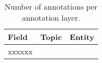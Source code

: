 \documentclass[preview=true]{standalone}
\begin{document}
\begin{table}[ht]
	\footnotesize
	\begin{tabularx}{\linewidth}{XXl}%
		\toprule
		\textbf{Field} &\textbf{Topic}&\textbf{Entity}\\
		\midrule
		xxxxxx
		\bottomrule
	\end{tabularx}
	\caption{Number of annotations per annotation layer.} %
	\label{tab:annotation}
\end{table}
\end{document}

